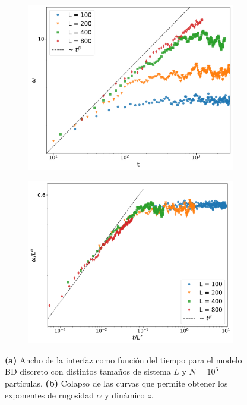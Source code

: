 \begin{figure}[!b]
    \hspace*{-1cm}
    \begin{subfigure}{.55\textwidth}
      \centering
      \includegraphics[width=\textwidth]{width_L.pdf}
      \caption{}
    \end{subfigure}
    \begin{subfigure}{.55\textwidth}
      \centering
      \includegraphics[width=\textwidth]{width_L_colapse.pdf}
      \caption{}
    \end{subfigure}
    \caption[Ancho de la interfaz en el modelo BD discreto para distintos tamaños de sistema y colapso de curvas.]{\textbf{(a)} Ancho de la interfaz como función del tiempo para el modelo BD discreto con distintos tamaños de sistema $L$ y $N = 10^6$ partículas. \textbf{(b)} Colapso de las curvas que permite obtener los exponentes de rugosidad $\alpha$ y dinámico $z$.}
    \label{fig:width_L}
\end{figure}


